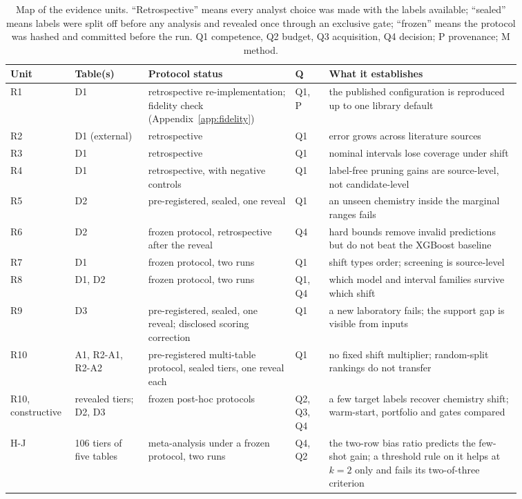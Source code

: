 \documentclass[11pt,a4paper]{article}
\begin{document}
\begin{table}[htbp]
\centering\footnotesize
\caption{Map of the evidence units. ``Retrospective'' means every analyst
choice was made with the labels available; ``sealed'' means labels were split
off before any analysis and revealed once through an exclusive gate;
``frozen'' means the protocol was hashed and committed before the run. Q1
competence, Q2 budget, Q3 acquisition, Q4 decision; P provenance; M method.}
\label{tab:resultsmap}
\begin{tabular}{p{0.07\linewidth}p{0.13\linewidth}p{0.26\linewidth}p{0.06\linewidth}p{0.34\linewidth}}
\toprule
Unit & Table(s) & Protocol status & Q & What it establishes \\
\midrule
R1 & D1 & retrospective re-implementation; fidelity check (Appendix~\ref{app:fidelity}) & Q1, P & the published configuration is reproduced up to one library default \\
R2 & D1 (external) & retrospective & Q1 & error grows across literature sources \\
R3 & D1 & retrospective & Q1 & nominal intervals lose coverage under shift \\
R4 & D1 & retrospective, with negative controls & Q1 & label-free pruning gains are source-level, not candidate-level \\
R5 & D2 & pre-registered, sealed, one reveal & Q1 & an unseen chemistry inside the marginal ranges fails \\
R6 & D2 & frozen protocol, retrospective after the reveal & Q4 & hard bounds remove invalid predictions but do not beat the XGBoost baseline \\
R7 & D1 & frozen protocol, two runs & Q1 & shift types order; screening is source-level \\
R8 & D1, D2 & frozen protocol, two runs & Q1, Q4 & which model and interval families survive which shift \\
R9 & D3 & pre-registered, sealed, one reveal; disclosed scoring correction & Q1 & a new laboratory fails; the support gap is visible from inputs \\
R10 & A1, R2-A1, R2-A2 & pre-registered multi-table protocol, sealed tiers, one reveal each & Q1 & no fixed shift multiplier; random-split rankings do not transfer \\
R10, constructive & revealed tiers; D2, D3 & frozen post-hoc protocols & Q2, Q3, Q4 & a few target labels recover chemistry shift; warm-start, portfolio and gates compared \\
H-J & 106 tiers of five tables & meta-analysis under a frozen protocol, two runs & Q4, Q2 & the two-row bias ratio predicts the few-shot gain; a threshold rule on it helps at $k=2$ only and fails its two-of-three criterion \\

\end{tabular}
\end{table}
\end{document}
